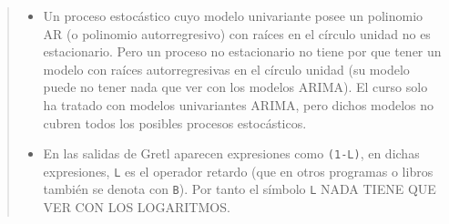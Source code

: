 \documentclass[10pt]{article}
\begin{document}
\begin{quote}
\begin{itemize}
\item Un proceso estocástico cuyo modelo univariante posee un polinomio AR
(o polinomio autorregresivo) con raíces en el círculo unidad no es
estacionario. Pero un proceso no estacionario no tiene por que tener
un modelo con raíces autorregresivas en el círculo unidad (su modelo
puede no tener nada que ver con los modelos ARIMA). El curso solo ha
tratado con modelos univariantes ARIMA, pero dichos modelos no
cubren todos los posibles procesos estocásticos.
\end{itemize}


\begin{itemize}
\item En las salidas de Gretl aparecen expresiones como \texttt{(1-L)}, en dichas
expresiones, \texttt{L} es el operador retardo (que en otros programas o
libros también se denota con \texttt{B}). Por tanto el símbolo \texttt{L} NADA
TIENE QUE VER CON LOS LOGARITMOS.
\end{itemize}
\end{quote}
\end{document}
